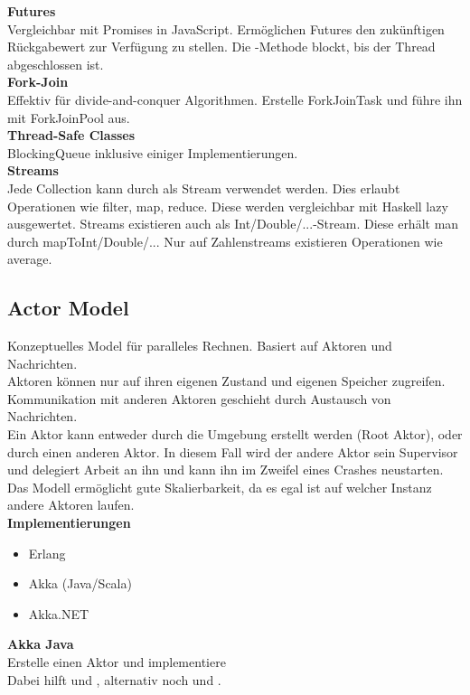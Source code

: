 \textbf{Futures}\\
Vergleichbar mit Promises in JavaScript. Ermöglichen Futures den zukünftigen Rückgabewert zur Verfügung zu stellen.
Die -Methode blockt, bis der Thread abgeschlossen ist.\\

\textbf{Fork-Join}\\
Effektiv für divide-and-conquer Algorithmen. Erstelle ForkJoinTask und führe ihn mit ForkJoinPool aus.\\

\textbf{Thread-Safe Classes}\\
BlockingQueue inklusive einiger Implementierungen.\\

\textbf{Streams}\\
Jede Collection kann durch  als Stream verwendet werden.
Dies erlaubt Operationen wie filter, map, reduce.
Diese werden vergleichbar mit Haskell lazy ausgewertet.
Streams existieren auch als Int/Double/...-Stream. Diese erhält man durch mapToInt/Double/...
Nur auf Zahlenstreams existieren Operationen wie average.

\newpage
\subsection{Actor Model}%
\label{pp:sub:actor-model}
Konzeptuelles Model für paralleles Rechnen. Basiert auf Aktoren und Nachrichten.\\
Aktoren können nur auf ihren eigenen Zustand und eigenen Speicher zugreifen. Kommunikation mit anderen Aktoren geschieht
durch Austausch von Nachrichten. \\
Ein Aktor kann entweder durch die Umgebung erstellt werden (Root Aktor),
oder durch einen anderen Aktor. In diesem Fall wird der andere Aktor sein Supervisor und delegiert Arbeit an ihn und
kann ihn im Zweifel eines Crashes neustarten.\\
Das Modell ermöglicht gute Skalierbarkeit, da es egal ist auf welcher Instanz andere Aktoren laufen.\\

\textbf{Implementierungen}
\begin{itemize}
  \item Erlang
  \item Akka (Java/Scala)
  \item Akka.NET
\end{itemize}

\textbf{Akka Java}\\
Erstelle einen Aktor  und implementiere \\
Dabei hilft  und , alternativ noch  und .\\


